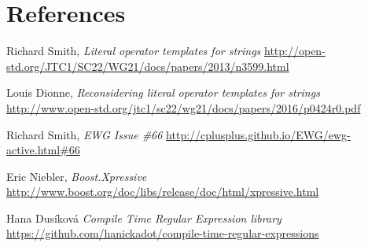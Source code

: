 \documentclass{wg21}
\begin{document}
\section{References}
\renewcommand{\section}[2]{}%
\begin{thebibliography}{9}

    Richard Smith,
    \emph{Literal operator templates for strings}\newline
    \url{http://open-std.org/JTC1/SC22/WG21/docs/papers/2013/n3599.html}

    Louis Dionne,
    \emph{Reconsidering literal operator templates for strings}\newline
    \url{http://www.open-std.org/jtc1/sc22/wg21/docs/papers/2016/p0424r0.pdf}

    Richard Smith,
    \emph{EWG Issue \#66}\newline
    \url{http://cplusplus.github.io/EWG/ewg-active.html#66}

    Eric Niebler,
    \emph{Boost.Xpressive}\newline
    \url{http://www.boost.org/doc/libs/release/doc/html/xpressive.html}
		
    Hana Dus\'{i}kov\'{a}
    \emph{Compile Time Regular Expression library}\newline
    \url{https://github.com/hanickadot/compile-time-regular-expressions}

\end{thebibliography}
\end{document}
